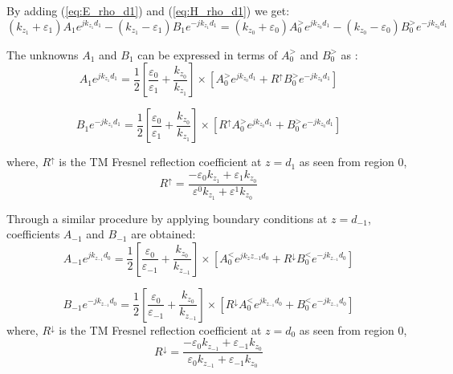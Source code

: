 \documentclass[11pt]{article}
\begin{document}
  By adding (\ref{eq:E_rho_d1}) and (\ref{eq:H_rho_d1}) we get:
  \begin{equation}
    \left( k_{z_1} + \varepsilon_1 \right) A_1 e^{jk_{z_1} d_1} - \left( k_{z_1} - \varepsilon_1 \right) B_1 e^{-jk_{z_1} d_1}  = \left( k_{z_0} + \varepsilon_0 \right) A_0^> e^{jk_{z_0} d_1} - \left( k_{z_0} - \varepsilon_0 \right) B_0^> e^{-jk_{z_0} d_1}
    \label{eq:sum}
  \end{equation}

  The unknowns $A_1$ and $B_1$ can be expressed in terms of $A_0^>$ and $B_0^>$ as \cite{kong1990electromagnetic}:
  \begin{equation}
    A_1 e^{jk_{z_1} d_1} = \frac{1}{2} \left[ \frac{\varepsilon_0}{\varepsilon_1} + \frac{k_{z_0}}{k_{z_1}} \right] \times \left[  A_0^> e^{jk_{z_0} d_1} + R^{\uparrow} B_0^> e^{-jk_{z_0} d_1} \right]
    \label{eq:A_1}
  \end{equation}

  \begin{equation}
    B_1 e^{-jk_{z_1} d_1} = \frac{1}{2} \left[ \frac{\varepsilon_0}{\varepsilon_1} + \frac{k_{z_0}}{k_{z_1}} \right] \times \left[R^{\uparrow}  A_0^> e^{jk_{z_0} d_1} + B_0^> e^{-jk_{z_0} d_1} \right]
    \label{eq:B_1}
  \end{equation}

  where, $R^{\uparrow}$ is the TM Fresnel reflection coefficient at $ z=d_1$ as seen from region 0,
  \begin{equation}
    R^{\uparrow} = \frac{-\varepsilon_0 k_{z_1} + \varepsilon_1 k_{z_0}}{\varepsilon^0 k_{z_1} + \varepsilon^1 k_{z_0}}
    \label{eq:R_up}
  \end{equation}

  Through a similar procedure by applying boundary conditions at $z=d_{-1}$, coefficients $A_{-1}$ and $B_{-1}$ are obtained:
  \begin{equation}
    A_{-1} e^{jk_{z_{-1}} d_{0}} = \frac{1}{2} \left[ \frac{\varepsilon_0}{\varepsilon_{-1}} + \frac{k_{z_0}}{k_{z_{-1}}} \right] \times \left[  A_0^< e^{jk_z{z_{-1}} d_0} + R^{\downarrow} B_0^< e^{-jk_{z_{-1}} d_0} \right]
    \label{eq:A_-1}
  \end{equation}

  \begin{equation}
    B_{-1} e^{-jk_{z_{-1}} d_0} = \frac{1}{2} \left[ \frac{\varepsilon_0}{\varepsilon_{-1}} + \frac{k_{z_0}}{k_{z_{-1}}} \right] \times \left[R^{\downarrow}  A_0^< e^{jk_{z_{-1}} d_0} + B_0^< e^{-jk_{z_{-1}} d_0} \right]
    \label{eq:B_-1}
  \end{equation}
  where, $R^{\downarrow}$ is the TM Fresnel reflection coefficient at $ z=d_0$ as seen from region 0,
  \begin{equation}
    R^{\downarrow} = \frac{-\varepsilon_0 k_{z_{-1}} + \varepsilon_{-1} k_{z_0}}{\varepsilon_0 k_{z_{-1}} + \varepsilon_{-1} k_{z_0}}
    \label{eq:R_up}
  \end{equation}
\end{document}
